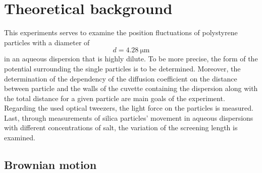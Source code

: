 \documentclass[.../bericht]{subfilies}
\begin{document}
  \chapter{Theoretical background}

    This experiments serves to examine the position fluctuations of polystyrene particles with a diameter of
    \begin{equation*}
      d=\SI{4,28}{\micro\meter}
    \end{equation*}
    in an aqueous dispersion that is highly dilute. To be more precise, the form of the potential surrounding the single particles is to be determined. Moreover, the determination of the dependency of the diffusion coefficient on the distance between particle and the walls of the cuvette containing the dispersion along with the total distance for a given particle are main goals of the experiment. Regarding the used optical tweezers, the light force on the particles is measured. Last, through measurements of silica particles' movement in aqueous dispersions with different concentrations of salt, the variation of the screening length is examined.

    \section{Brownian motion}
\end{document}
